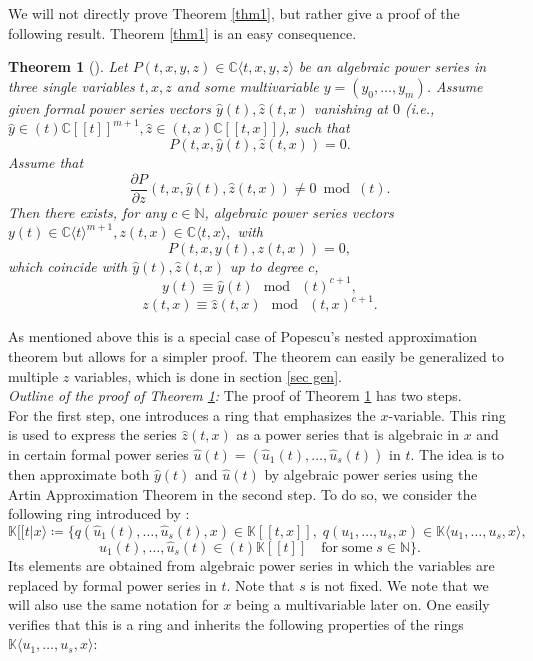 \documentclass[10pt, a4paper]{article}
\newtheorem{theorem}{Theorem}[section]
\def\wh{\widehat}
\theoremstyle{remark}
\theoremstyle{remark}
\begin{document}
\noindent We will not directly prove Theorem \ref{thm1}, but rather give a proof of the following result. Theorem \ref{thm1} is an easy consequence.
\begin{theorem}[\cite{Denef1980}]\label{easiest pop}
Let $P(t,x,y,z)\in \mathbb{C}\langle t,x,y,z\rangle$ be an
algebraic power series in three single variables $t,x,z$ and some multivariable $y=(y_0,\ldots,y_m)$. Assume given formal power series vectors $\widehat{y}(t),\wh{z}(t,x)$ vanishing at $0$ (i.e., $\wh{y}\in (t)\mathbb{C}[[t]]^{m+1},\wh{z}\in (t,x)\mathbb{C}[[t,x]]$), such that
$$P(t,x,\wh{y}(t),\wh{z}(t,x))= 0.$$
Assume that $$\frac{\partial P}{\partial z}(t,x,\widehat{y}(t),\widehat{z}(t,x))\neq0\bmod (t).$$
Then there exists, for any $c \in \mathbb{N}$, algebraic
power series vectors $y(t)\in \mathbb{C}\langle t\rangle^{m+1},z(t,x)\in\mathbb{C}\langle t,x\rangle,$ with $$P(t,x, y(t)
,z(t,x)) = 0,$$
which coincide with $\wh{y}(t),\wh{z}(t,x)$ up to degree $c$,
$$y(t)\equiv \wh{y}(t) \: \bmod \:(t)^{c+1},$$
$$z(t,x)\equiv \wh{z}(t,x) \: \bmod \:(t,x)^{c+1}.$$
\end{theorem}
\noindent As mentioned above this is a special case of Popescu's nested approximation theorem but allows for a simpler proof. The theorem can easily be generalized to multiple $z$ variables, which is done in section \ref{sec gen}. 
\\ \textit{Outline of the proof of Theorem \ref{easiest pop}:} The proof of Theorem \ref{easiest pop} has two steps. 
\\For the first step, one introduces a ring that emphasizes the $x$-variable. This ring is used to express the series $\wh{z}(t,x)$ as a power series that is algebraic in $x$ and in certain formal power series $\wh{u}(t)=(\wh{u}_1(t),\ldots,\wh{u}_s(t))$ in $t$. The idea is to then approximate both $\wh{y}(t)$ and $\wh{u}(t)$ by algebraic power series using the Artin Approximation Theorem in the second step. To do so, we consider the following ring introduced by \cite{Denef1980}:
$$\mathbb{K}[[t\vert x\rangle\coloneqq\{q(\wh{u}_1(t),\ldots,\wh{u}_s(t),x)\in\mathbb{K}[[t,x]],\;q(u_1,\ldots,u_s,x)\in \mathbb{K}\langle u_1,\ldots, u_s,x \rangle,$$$$  \wh{u}_1(t),\ldots, \wh{u}_s(t)\in (t)\mathbb{K}[[t]]\quad \mathrm{for}\;\mathrm{some}\;s\in \mathbb{N}\}.$$
Its elements are obtained from algebraic power series in which the variables are replaced by formal power series in $t$. Note that $s$ is not fixed. We note that we will also use the same notation for $x$ being a multivariable later on. One easily verifies that this is a ring and inherits the following properties of the rings $\mathbb{K}\langle u_1,\ldots,u_s,x\rangle$:
\end{document}
